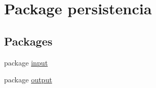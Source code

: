 \hypertarget{namespacepersistencia}{}\section{Package persistencia}
\label{namespacepersistencia}
\subsection*{Packages}
\begin{DoxyCompactItemize}
\item 
package \hyperlink{namespacepersistencia_1_1input}{input}
\item 
package \hyperlink{namespacepersistencia_1_1output}{output}
\end{DoxyCompactItemize}
